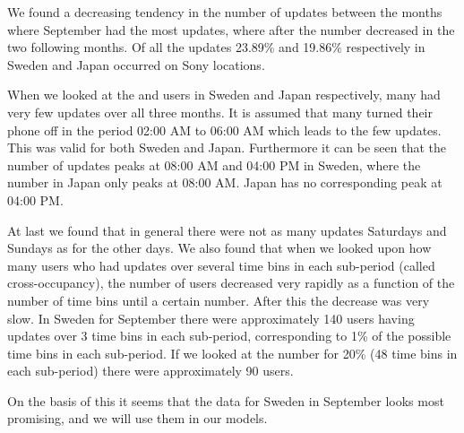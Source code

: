 We found a decreasing tendency in the number of updates between the months where September had the most updates, where after the number decreased in the two following months. Of all the updates 23.89\% and 19.86\% respectively in Sweden and Japan occurred on Sony locations.  

When we looked at the \numberUsersSweden{} and \numberUsersJapan{} users in Sweden and Japan respectively, many had very few updates over all three months. It is assumed that many turned their phone off in the period 02:00 AM to 06:00 AM which leads to the few updates. This was valid for both Sweden and Japan. Furthermore it can be seen that the number of updates peaks at 08:00 AM and 04:00 PM in Sweden, where the number in Japan only peaks at 08:00 AM.  Japan has no corresponding peak at 04:00 PM. 

At last we found that in general there were not as many updates Saturdays and Sundays as for the other days. We also found that when we looked upon how many users who had updates over several time bins in each sub-period (called cross-occupancy), the number of users decreased very rapidly as a function of the number of time bins until a certain number. After this the decrease was very slow. In Sweden for September there were approximately 140 users having updates over 3 time bins in each sub-period, corresponding to 1\% of the possible time bins in each sub-period. If we looked at the number for 20\% (48 time bins in each sub-period) there were approximately 90  users. 

On the basis of this it seems that the data for Sweden in September looks most promising, and we will use them in our models. 
